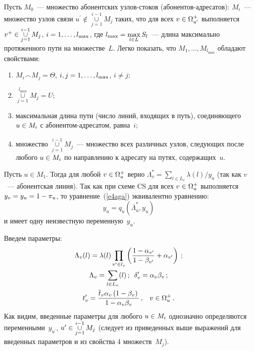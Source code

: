 \begin{multicols}{2}
Пусть $M_0$~--- множество абонентских узлов-сто\-ков 
(або\-нен\-тов-адре\-са\-тов): $M_i$~--- множество узлов связи $u^\prime 
\not\in \mathop{\cup}\limits_{j=1}^{i-1} M_j$ таких, что для всех 
$v\hm\in\Omega^+_{u^\prime}$ выполняется $v^+\hm\in \mathop{\cup}\limits_{j=1}^{i-
1} M_j$, $i\hm=1, \ldots , l_{\max}$, где $l_{\max} \hm=\max\limits_{l\in L} S_l$~--- 
длина максимально протяженного пути на множестве~$L$. Легко показать, 
что $M_1, \ldots ,M_{l_{\max}}$ обладают свойствами:
\begin{enumerate}[(1)]
\item
   $M_i\frown M_j =\Theta$, $i,j\hm=1, \ldots , l_{\max}$, $i\not=j$;
   \item 
   $\mathop{\cup}\limits_{j=1}^{l_{\max}} M_j=U$;
   \item  максимальная длина пути (число линий, входящих в путь), 
соединяющего $u\hm\in M_i$ с або\-нен\-том-ад\-ре\-са\-том, равна~$i$; 
   \item  множество $\mathop{\cup}\limits_{j=1}^{i-1} M_j$~--- множество всех 
различных узлов, следующих после любого $u\hm\in M_i$ по направлению к 
адресату на путях, содержащих~$u$.
     \end{enumerate}
     
     Пусть $u\in M_1$. Тогда для любой $v\hm\in \Omega_u^+$ верно 
$\Lambda_v^*=\sum\limits_{l\in L_v} \lambda(l)/y_u$ (так как $v$~--- 
абонентская линия). Так как при схеме CS для всех $v\hm\in \Omega_u^+$ 
выполняется $y_v\hm=y_u\hm=1-\pi_u$, то уравнение~(\ref{e4aga}) 
эквивалентно уравнению: 
     \begin{equation}
     y_u=q_u\left(\overline{\Lambda}^*_u, y_u\right)
     \label{e18aga}
     \end{equation}
и имеет одну неизвестную переменную~$y_u$. 
     
     Введем параметры:
     \begin{gather*}
     \Lambda_v(l) =\lambda(l)\prod\limits_{v^\prime\in l_v} \left( \fr{1-
\alpha_{v^\prime}}{1-\beta_{v^\prime}}+\alpha_{v^\prime}\right)\,;\\
     \Lambda_v=\sum\limits_{l\in L_v}(l)\,;\enskip 
\delta_v^\prime=\alpha_v\beta_v\,;\\
     t_v^\prime=\fr{\overline{t}_v\alpha_v\left(1-\beta_v\right)}{1-\alpha_v\beta_v}\,,\ 
\enskip v\in\Omega_u^+\,.
     \end{gather*}
Как видим, введенные параметры для любого $u\hm\in M_i$ однозначно 
определяются переменными~$y_{u^\prime}$, $u^\prime\hm\in 
\mathop{\cup}\limits_{j=1}^{i-1} M_j$ (следует из приведенных выше выражений для 
введенных параметров и из свойства 4 множеств~$M_j$).
     

\end{multicols}
